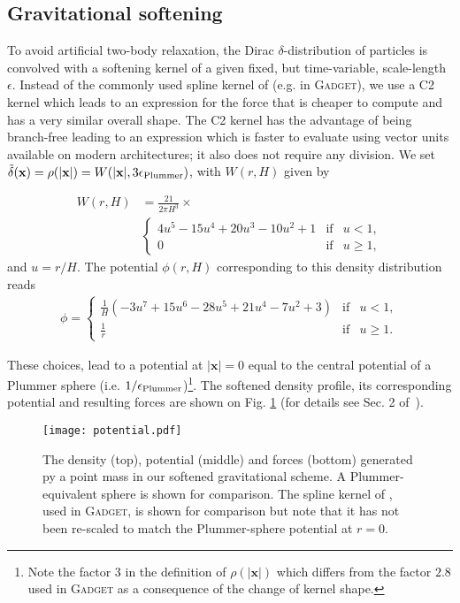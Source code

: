 \subsection{Gravitational softening}
\label{ssec:potential_softening}

To avoid artificial two-body relaxation, the Dirac
$\delta$-distribution of particles is convolved with a softening
kernel of a given fixed, but time-variable, scale-length
$\epsilon$. Instead of the commonly used spline kernel of
\cite{Monaghan1985} (e.g. in \textsc{Gadget}), we use a C2 kernel
\citep{Wendland1995} which leads to an expression for the force that
is cheaper to compute and has a very similar overall shape. The C2
kernel has the advantage of being branch-free leading to an expression
which is faster to evaluate using vector units available on modern
architectures; it also does not require any division. We set
$\tilde\delta(\mathbf{x}) = \rho(|\mathbf{x}|) = W(|\mathbf{x}|,
3\epsilon_{\rm Plummer})$, with $W(r, H)$ given by

\begin{align}
W(r,H) &= \frac{21}{2\pi H^3} \times \nonumber \\
&\left\lbrace\begin{array}{rcl}
4u^5 - 15u^4 + 20u^3 - 10u^2 + 1 & \mbox{if} & u < 1,\\
0 & \mbox{if} & u \geq 1,
\end{array}
\right.
\end{align}
and $u = r/H$. The potential $\phi(r,H)$ corresponding to this density distribution reads
\begin{align}
\phi = 
\left\lbrace\begin{array}{rcl}
\frac{1}{H} (-3u^7 + 15u^6 - 28u^5 + 21u^4 - 7u^2 + 3) & \mbox{if} & u < 1,\\
\frac{1}{r} & \mbox{if} & u \geq 1.
\end{array}
\right.
\label{eq:fmm:potential}
\end{align}

These choices, lead to a potential at $|\mathbf{x}| = 0$ equal to the
central potential of a Plummer sphere (i.e. $1/\epsilon_{\rm
Plummer}$)\footnote{Note the factor $3$ in the definition of
$\rho(|\mathbf{x}|)$ which differs from the factor $2.8$ used
in \textsc{Gadget} as a consequence of the change of kernel
shape.}. The softened density profile, its corresponding potential and
resulting forces are shown on Fig. \ref{fig:fmm:softening} (for
details see Sec. 2 of~\cite{Price2007}).


\begin{figure}
\texttt{[image: potential.pdf]}
\caption{The density (top), potential (middle) and forces (bottom)
  generated py a point mass in our softened gravitational scheme.
  A Plummer-equivalent sphere is shown for comparison. The spline
  kernel of \citet{Monaghan1985}, used in \textsc{Gadget}, is shown
  for comparison but note that it has not been re-scaled to match the
  Plummer-sphere potential at $r=0$.  %
  }
\label{fig:fmm:softening}
\end{figure}
